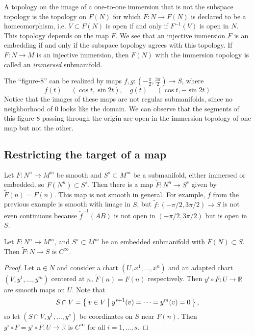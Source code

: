 A topology on the image of a one-to-one immersion that is not the
subspace topology is the topology on $F(N)$ for which
$F: N \to F(N)$ is declared to be a homeomorphism, i.e.
$V \subset F(N)$ is open if and only if $F^{-1}(V)$ is open in $N$.
This topology depends on the map $F$. We see that an injective
immersion $F$ is an embedding if and only if the subspace topology
agrees with this topology. If $F : N \to M$ is an injective immersion,
then $F(N)$ with the immersion topology is called an \emph{immersed}
submanifold.

\begin{xmpl}
The ``figure-8'' can be realized by maps
$f, g: \left(-\frac{\pi}{2}, \frac{3 \pi}{2}\right) \to S$, where
$$
f(t) = (\cos t, \sin 2t), \quad
g(t) = (\cos t, -\sin 2t)
$$
Notice that the images of these maps are not regular submanifolds,
since no neighborhood of 0 looks like the domain. We can observe that
the segments of this figure-8 passing through the origin are open in
the immersion topology of one map but not the other.
\end{xmpl}

\subsection{Restricting the target of a map}
Let $F: N^n \to M^m$ be smooth and $S^s \subset M^m$ be a submanifold,
either immersed or embedded, so $F(N^n) \subset S^s$. Then there is a
map $\tilde{F} : N^n \to S^s$ given by $\tilde{F}(n) = F(n)$. This map
is not smooth in general. For example, $f$ from the previous example
is smooth with image in $S$, but $\tilde{f} : (-\pi/2, 3\pi/2) \to S$
is not even continuous because $\tilde{f}^{-1}(AB)$ is not open in
$(-\pi/2, 3\pi/2)$ but is open in $S$.

\begin{prop}
Let $F : N^n \to M^m$, and $S^s \subset M^m$ be an embedded
submanifold with $F(N) \subset S$. Then
$\tilde{F}: N \to S$ is $C^\infty$.
\end{prop}

\begin{proof}
Let $n \in N$ and consider a chart $(U, x^1, \dots, x^n)$ and an
adapted chart $(V, y^1, \dots, y^m)$ centered at $n$,
$\tilde{F}(n) = F(n)$ respectively. Then
$y^i \circ F : U \to \mathbb{R}$ are smooth maps on $U$. Note that
$$
  S \cap V
= \Set{ v \in V | y^{s+1}(v) = \cdots = y^m(v) = 0 },
$$
so let $(S \cap V, y^1, \dots, y^s)$ be coordinates on $S$ near
$F(n)$. Then $y^i \circ F = y^i \circ \tilde{F} : U \to \mathbb{R}$ is
$C^\infty$ for all $i=1, \dots, s$.
\end{proof}

